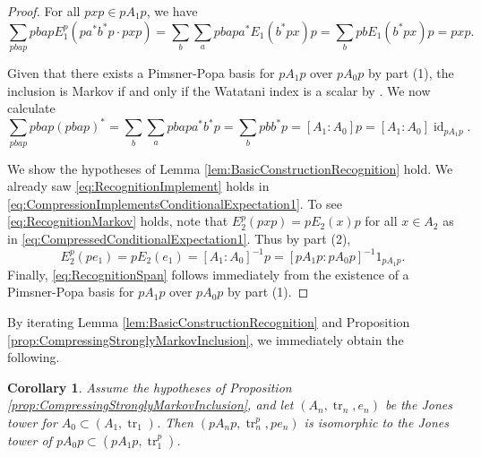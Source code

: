 \documentclass[11pt]{article}
\theoremstyle{plain}
\newtheorem{cor}[thm]{Corollary}
\theoremstyle{definition}
\DeclareMathOperator{\id}{id}
\DeclareMathOperator{\tr}{tr}
\begin{document}
\begin{proof}
\mbox{}
\item[\underline{Proof of (1):}]
For all $pxp \in pA_1p$, we have
$$
\sum_{pbap} 
pbap
E^p_1(pa^*b^*p \cdot pxp)
=
\sum_b
\sum_a
pbapa^* E_1(b^*px)p
=
\sum_b pbE_1(b^*px)p
=
pxp.
$$

\item[\underline{Proof of (2):}]
Given that there exists a Pimsner-Popa basis for $pA_1p$ over $pA_0p$ by part (1), the inclusion is Markov if and only if the Watatani index \cite{MR996807} is a scalar by \cite[1.1.4(c)]{MR1278111}.
We now calculate
$$
\sum_{pbap} pbap(pbap)^*
=
\sum_b\sum_a pbapa^*b^*p
=
\sum_b pbb^*p
=
[A_1:A_0] p
=
[A_1:A_0] \id_{pA_1p}.
$$

\item[\underline{Proof of (3):}]
We show the hypotheses of Lemma \ref{lem:BasicConstructionRecognition} hold.
We already saw \ref{eq:RecognitionImplement} holds in \eqref{eq:CompressionImplementsConditionalExpectation1}.
To see \ref{eq:RecognitionMarkov} holds, note that $E^p_2(pxp) = pE_2(x)p$ for all $x\in A_2$ as in  \eqref{eq:CompressedConditionalExpectation1}.
Thus by part (2),
$$
E^{p}_{2}(pe_1) 
= 
pE_2(e_1) 
= 
[A_1:A_0]^{-1}p 
= 
[pA_1p:pA_0p]^{-1} 1_{pA_1p}.
$$
Finally, \ref{eq:RecognitionSpan} follows immediately from the existence of a Pimsner-Popa basis for $pA_1p$ over $pA_0p$ by part (1).
\end{proof}

By iterating Lemma \ref{lem:BasicConstructionRecognition} and Proposition \ref{prop:CompressingStronglyMarkovInclusion}, we immediately obtain the following.

\begin{cor}
\label{cor:CompressJonesTower}
Assume the hypotheses of Proposition \ref{prop:CompressingStronglyMarkovInclusion}, and let $(A_n, \tr_n, e_n)$ be the Jones tower for $A_0 \subset (A_1, \tr_1)$.
Then $(pA_np, \tr_n^p, pe_n)$ is isomorphic to the Jones tower of $pA_0p \subset (pA_1p, \tr_1^p)$.
\end{cor}
\end{document}
